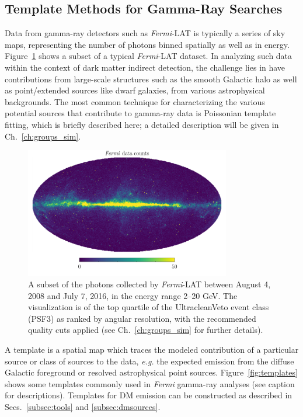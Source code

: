 \subsection{Template Methods for Gamma-Ray Searches}
\label{subsec:statmethods}

Data from gamma-ray detectors such as \emph{Fermi}-LAT is typically a series of sky maps, representing the number of photons binned spatially as well as in energy. Figure~\ref{fig:data} shows a subset of a typical \emph{Fermi}-LAT dataset. In analyzing such data within the context of dark matter indirect detection, the challenge lies in have contributions from large-scale structures such as the smooth Galactic halo as well as point/extended sources like dwarf galaxies, from various astrophysical backgrounds. The most common technique for characterizing the various potential sources that contribute to gamma-ray data is Poissonian template fitting, which is briefly described here; a detailed description will be given in Ch.~\ref{ch:groups_sim}. 

\begin{figure}[htbp] 
\centering
 \includegraphics[width=0.8\textwidth]{ch-intro/data.pdf}
\caption{A subset of the photons collected by \emph{Fermi}-LAT between August 4, 2008 and July 7, 2016, in the energy range 2--20 GeV. The visualization is of the top quartile of the UltracleanVeto event class (PSF3) as ranked by angular resolution, with the recommended quality cuts applied (see Ch.~\ref{ch:groups_sim} for further details).}  
\label{fig:data}
\end{figure}

A template is a spatial map which traces the modeled contribution of a particular source or class of sources to the data, \emph{e.g.} the expected emission from the diffuse Galactic foreground or resolved astrophysical point sources. Figure~\ref{fig:templates} shows some templates commonly used in \emph{Fermi} gamma-ray analyses (see caption for descriptions). Templates for DM emission can be constructed as described in Secs.~\ref{subsec:tools} and \ref{subsec:dmsources}. 

